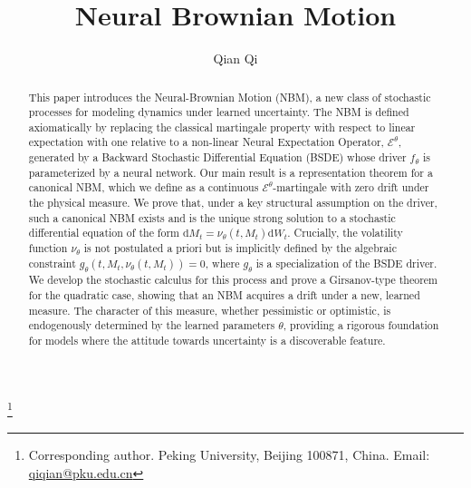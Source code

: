 \documentclass[qian]{imsart}
\newcommand{\cEneutheta}{\mathcal{E}^{\theta}}
\newcommand{\dd}{\mathrm{d}}
\theoremstyle{plain}
\theoremstyle{definition}
\begin{document}
\begin{frontmatter}

\title{Neural Brownian Motion}
\author{Qian Qi}
\thanks{Corresponding author. Peking University, Beijing 100871, China. Email: \href{mailto:qiqian@pku.edu.cn}{qiqian@pku.edu.cn}}


\begin{abstract}
This paper introduces the Neural-Brownian Motion (NBM), a new class of stochastic processes for modeling dynamics under learned uncertainty. The NBM is defined axiomatically by replacing the classical martingale property with respect to linear expectation with one relative to a non-linear Neural Expectation Operator, $\cEneutheta$, generated by a Backward Stochastic Differential Equation (BSDE) whose driver $f_\theta$ is parameterized by a neural network. Our main result is a representation theorem for a canonical NBM, which we define as a continuous $\cEneutheta$-martingale with zero drift under the physical measure. We prove that, under a key structural assumption on the driver, such a canonical NBM exists and is the unique strong solution to a stochastic differential equation of the form $\dd M_t = \nu_\theta(t, M_t) \dd W_t$. Crucially, the volatility function $\nu_\theta$ is not postulated a priori but is implicitly defined by the algebraic constraint $g_\theta(t, M_t, \nu_\theta(t, M_t)) = 0$, where $g_\theta$ is a specialization of the BSDE driver. We develop the stochastic calculus for this process and prove a Girsanov-type theorem for the quadratic case, showing that an NBM acquires a drift under a new, learned measure. The character of this measure, whether pessimistic or optimistic, is endogenously determined by the learned parameters $\theta$, providing a rigorous foundation for models where the attitude towards uncertainty is a discoverable feature.
\end{abstract}


\begin{keyword}[class=MSC2020]
\end{keyword}

\begin{keyword}
\end{keyword}

\end{frontmatter}
\end{document}
